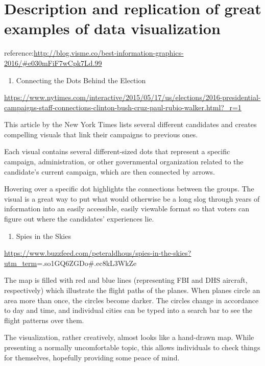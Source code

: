 \documentclass[]{book}
\providecommand{\tightlist}{%
  \setlength{\itemsep}{0pt}\setlength{\parskip}{0pt}}
\theoremstyle{definition}
\theoremstyle{definition}
\theoremstyle{definition}
\theoremstyle{remark}
\begin{document}
\section{Description and replication of great examples of data
visualization}\label{description-and-replication-of-great-examples-of-data-visualization}

reference:\url{http://blog.visme.co/best-information-graphics-2016/\#e030mFiF7wCpk7Ld.99}

\begin{enumerate}
\def\labelenumi{\arabic{enumi}.}
\tightlist
\item
  Connecting the Dots Behind the Election
\end{enumerate}

\url{https://www.nytimes.com/interactive/2015/05/17/us/elections/2016-presidential-campaigns-staff-connections-clinton-bush-cruz-paul-rubio-walker.html?_r=1}

This article by the New York Times lists several different candidates
and creates compelling visuals that link their campaigns to previous
ones.

Each visual contains several different-sized dots that represent a
specific campaign, administration, or other governmental organization
related to the candidate's current campaign, which are then connected by
arrows.

Hovering over a specific dot highlights the connections between the
groups. The visual is a great way to put what would otherwise be a long
slog through years of information into an easily accessible, easily
viewable format so that voters can figure out where the candidates'
experiences lie.

\begin{enumerate}
\def\labelenumi{\arabic{enumi}.}
\setcounter{enumi}{1}
\tightlist
\item
  Spies in the Skies
\end{enumerate}

\url{https://www.buzzfeed.com/peteraldhous/spies-in-the-skies?utm_term}=.so1GQ6ZGDo\#.ec8kL3WkZe

The map is filled with red and blue lines (representing FBI and DHS
aircraft, respectively) which illustrate the flight paths of the planes.
When planes circle an area more than once, the circles become darker.
The circles change in accordance to day and time, and individual cities
can be typed into a search bar to see the flight patterns over them.

The visualization, rather creatively, almost looks like a hand-drawn
map. While presenting a normally uncomfortable topic, this allows
individuals to check things for themselves, hopefully providing some
peace of mind.
\end{document}
